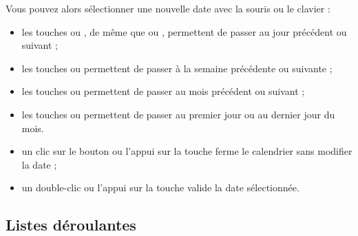 Vous pouvez alors sélectionner une nouvelle date avec la souris ou le clavier :
\begin{itemize}
	\ifIllustration
	\label{transactions-calendar-img}
	\fi
	\item les touches \key{+} ou \key{-}, de même que  ou , permettent de passer au jour précédent ou suivant ;
	\item les touches  ou  permettent de passer à la semaine précédente ou suivante ;
	\item les touches  ou  permettent de passer au mois précédent ou suivant ;
	\item les touches  ou  permettent de passer au premier jour ou au dernier jour du mois.
	\item un clic sur le bouton  ou l'appui sur la touche  ferme le calendrier sans modifier la date ;
	\item un double-clic ou l'appui sur la touche  valide la date sélectionnée.
\end{itemize}

\ifIllustration
\else
\fi


\subsection{Listes déroulantes\label{transactions-new-lists}}

